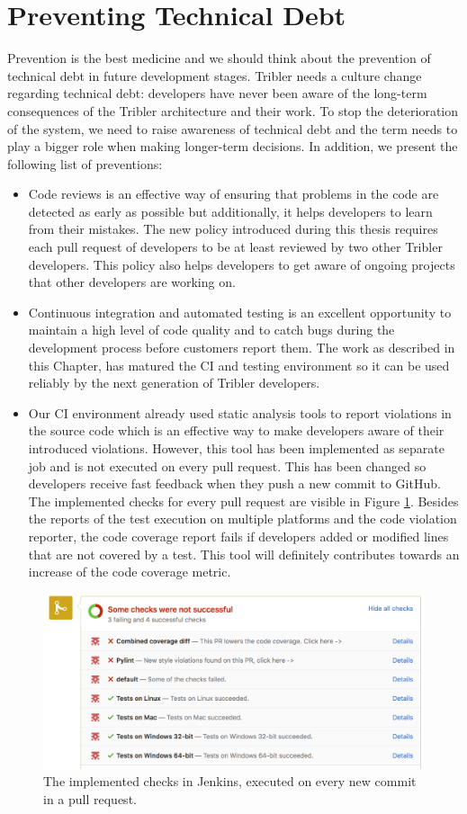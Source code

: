 \section{Preventing Technical Debt}
Prevention is the best medicine and we should think about the prevention of technical debt in future development stages. Tribler needs a culture change regarding technical debt: developers have never been aware of the long-term consequences of the Tribler architecture and their work. To stop the deterioration of the system, we need to raise awareness of technical debt and the term needs to play a bigger role when making longer-term decisions. In addition, we present the following list of preventions:
\begin{itemize}
	\item Code reviews is an effective way of ensuring that problems in the code are detected as early as possible\cite{18fpreventdebt} but additionally, it helps developers to learn from their mistakes. The new policy introduced during this thesis requires each pull request of developers to be at least reviewed by two other Tribler developers. This policy also helps developers to get aware of ongoing projects that other developers are working on.
	\item Continuous integration and automated testing is an excellent opportunity to maintain a high level of code quality and to catch bugs during the development process before customers report them. The work as described in this Chapter, has matured the CI and testing environment so it can be used reliably by the next generation of Tribler developers.
	\item Our CI environment already used static analysis tools to report violations in the source code which is an effective way to make developers aware of their introduced violations\cite{nagappan2005static}. However, this tool has been implemented as separate job and is not executed on every pull request. This has been changed so developers receive fast feedback when they push a new commit to GitHub. The implemented checks for every pull request are visible in Figure \ref{fig:jenkins-check}. Besides the reports of the test execution on multiple platforms and the code violation reporter, the code coverage report fails if developers added or modified lines that are not covered by a test. This tool will definitely contributes towards an increase of the code coverage metric.
\end{itemize}

\begin{figure}[h!]
	\centering
	\includegraphics[width=1.0\columnwidth]{images/improving_qa/jenkins_checks}
	\caption{The implemented checks in Jenkins, executed on every new commit in a pull request.}
	\label{fig:jenkins-check}
\end{figure}